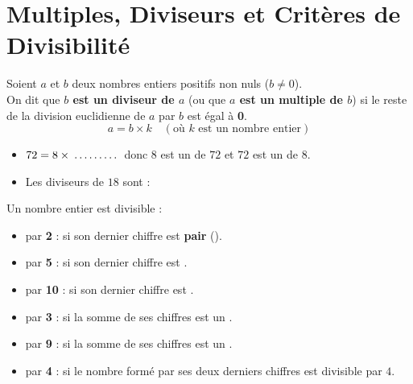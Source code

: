 \section{Multiples, Diviseurs et Critères de Divisibilité}

\begin{cadredef}
Soient $a$ et $b$ deux nombres entiers positifs non nuls ($b \neq 0$).\\
On dit que \textbf{$b$ est un diviseur de $a$} (ou que \textbf{$a$ est un multiple de $b$}) si le reste de la division euclidienne de $a$ par $b$ est égal à \textbf{0}.
\[ a = b \times k \quad (\text{où } k \text{ est un nombre entier}) \]
\end{cadredef}

\begin{cadreexemple}
\begin{itemize}
    \item $72 = 8 \times \pointille[1.5cm]$ donc $8$ est un \pointille[3cm] de $72$ et $72$ est un \pointille[3cm] de $8$.
    \item Les diviseurs de $18$ sont : \pointille[8cm]
\end{itemize}
\end{cadreexemple}

\begin{cadreprop}
Un nombre entier est divisible :
\begin{itemize}
    \item par \textbf{2} : si son dernier chiffre est \textbf{pair} (\pointille[4cm]).
    \item par \textbf{5} : si son dernier chiffre est \pointille[3cm].
    \item par \textbf{10} : si son dernier chiffre est \pointille[3cm].
    \item par \textbf{3} : si la somme de ses chiffres est un \pointille[4cm].
    \item par \textbf{9} : si la somme de ses chiffres est un \pointille[4cm].
    \item par \textbf{4} : si le nombre formé par ses deux derniers chiffres est divisible par $4$.
\end{itemize}
\end{cadreprop}

